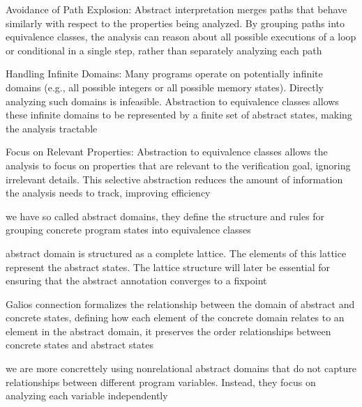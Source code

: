 \documentclass[a4paper]{article}
\begin{document}
\begin{minipage}[t]{0.16\linewidth}
\begin{betterlist}
{{\begin{betterlist}
\begin{betterlist}
						\item \alert{Avoidance of Path Explosion:} Abstract interpretation merges paths that behave similarly with respect to the properties being analyzed. By grouping paths into equivalence classes, the analysis can reason about all possible executions of a loop or conditional in a single step, rather than separately analyzing each path
						\item \alert{Handling Infinite Domains:} Many programs operate on potentially infinite domains (e.g., all possible integers or all possible memory states). Directly analyzing such domains is infeasible. Abstraction to equivalence classes allows these infinite domains to be represented by a finite set of abstract states, making the analysis tractable
						\item \alert{Focus on Relevant Properties:} Abstraction to equivalence classes allows the analysis to focus on properties that are relevant to the verification goal, ignoring irrelevant details. This selective abstraction reduces the amount of information the analysis needs to track, improving efficiency
					\end{betterlist}
					\item we have so called abstract domains, they define the structure and rules for grouping concrete program states into equivalence classes
					\begin{betterlist}
						\item abstract domain is structured as a complete lattice. The elements of this lattice represent the abstract states. The lattice structure will later be essential for ensuring that the abstract annotation converges to a fixpoint
						\item Galios connection formalizes the relationship between the domain of abstract and concrete states, defining how each element of the concrete domain relates to an element in the abstract domain, it preserves the order relationships between concrete states and abstract states%
						\item we are more concrettely using nonrelational abstract domains that do not capture relationships between different program variables. Instead, they focus on analyzing each variable independently

\end{betterlist}
\end{betterlist}}}
\end{betterlist}
\end{minipage}
\end{document}
